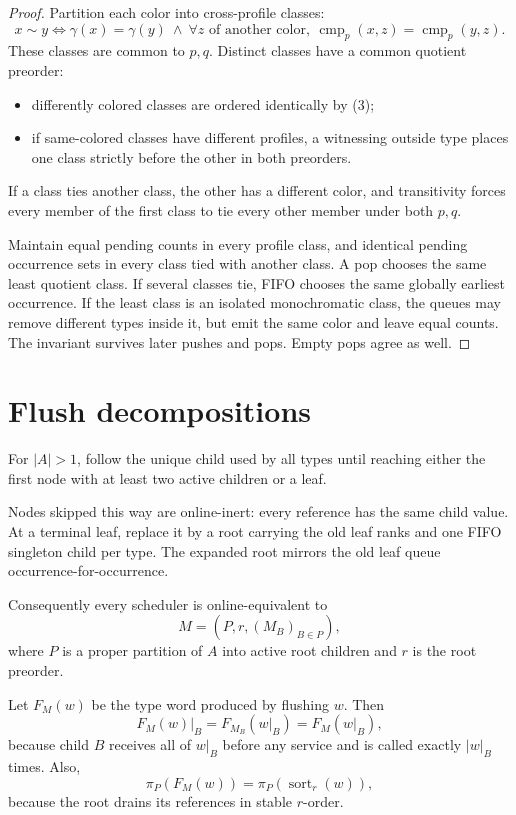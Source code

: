 \documentclass{amsart}
\theoremstyle{plain}
\theoremstyle{definition}
\begin{document}
\begin{proof}
Partition each color into cross-profile classes:
\[
x\sim y
\iff
\gamma(x)=\gamma(y)
\ \land\
\forall z\text{ of another color},\
\operatorname{cmp}_p(x,z)=\operatorname{cmp}_p(y,z).
\]
These classes are common to $p,q$. Distinct classes have a common quotient preorder:
\begin{itemize}
\item differently colored classes are ordered identically by (3);
\item if same-colored classes have different profiles, a witnessing outside type places one class strictly before the other in both preorders.
\end{itemize}
If a class ties another class, the other has a different color, and transitivity forces every member of the first class to tie every other member under both $p,q$.

Maintain equal pending counts in every profile class, and identical pending occurrence sets in every class tied with another class. A pop chooses the same least quotient class. If several classes tie, FIFO chooses the same globally earliest occurrence. If the least class is an isolated monochromatic class, the queues may remove different types inside it, but emit the same color and leave equal counts. The invariant survives later pushes and pops. Empty pops agree as well.
\end{proof}

\section{Flush decompositions}

For $|A|>1$, follow the unique child used by all types until reaching either the first node with at least two active children or a leaf.

Nodes skipped this way are online-inert: every reference has the same child value. At a terminal leaf, replace it by a root carrying the old leaf ranks and one FIFO singleton child per type. The expanded root mirrors the old leaf queue occurrence-for-occurrence.

Consequently every scheduler is online-equivalent to
\begin{equation*}
M=(P,r,(M_B)_{B\in P}), \tag{4}
\end{equation*}
where $P$ is a proper partition of $A$ into active root children and $r$ is the root preorder.

Let $F_M(w)$ be the type word produced by flushing $w$. Then
\begin{equation*}
F_M(w)|_B=F_{M_B}(w|_B)=F_M(w|_B), \tag{5}
\end{equation*}
because child $B$ receives all of $w|_B$ before any service and is called exactly $|w|_B$ times. Also,
\begin{equation*}
\pi_P(F_M(w))
=
\pi_P(\operatorname{sort}_r(w)), \tag{6}
\end{equation*}
because the root drains its references in stable $r$-order.
\end{document}
